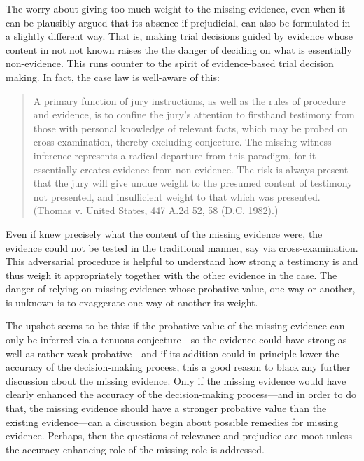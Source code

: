\documentclass[
  10pt,
  dvipsnames,enabledeprecatedfontcommands]{scrartcl}
\begin{document}
The worry about giving too much weight to the missing evidence, even
when it can be plausibly argued that its absence if prejudicial, can
also be formulated in a slightly different way. That is, making trial
decisions guided by evidence whose content in not not known raises the
the danger of deciding on what is essentially non-evidence. This runs
counter to the spirit of evidence-based trial decision making. In fact,
the case law is well-aware of this:

\begin{quote}
A primary function of jury instructions, as well as the rules of
procedure and evidence, is to confine the jury's attention to firsthand
testimony from those with personal knowledge of relevant facts, which
may be probed on cross-examination, thereby excluding conjecture. The
missing witness inference represents a radical departure from this
paradigm, for it essentially creates evidence from non-evidence. The
risk is always present that the jury will give undue weight to the
presumed content of testimony not presented, and insufficient weight to
that which was presented. (Thomas v. United States, 447 A.2d 52, 58
(D.C. 1982).)
\end{quote}

Even if knew precisely what the content of the missing evidence were,
the evidence could not be tested in the traditional manner, say via
cross-examination. This adversarial procedure is helpful to understand
how strong a testimony is and thus weigh it appropriately together with
the other evidence in the case. The danger of relying on missing
evidence whose probative value, one way or another, is unknown is to
exaggerate one way ot another its weight.

The upshot seems to be this: if the probative value of the missing
evidence can only be inferred via a tenuous conjecture---so the evidence
could have strong as well as rather weak probative---and if its addition
could in principle lower the accuracy of the decision-making process,
this a good reason to black any further discussion about the missing
evidence. Only if the missing evidence would have clearly enhanced the
accuracy of the decision-making process---and in order to do that, the
missing evidence should have a stronger probative value than the
existing evidence---can a discussion begin about possible remedies for
missing evidence. Perhaps, then the questions of relevance and prejudice
are moot unless the accuracy-enhancing role of the missing role is
addressed.
\end{document}

